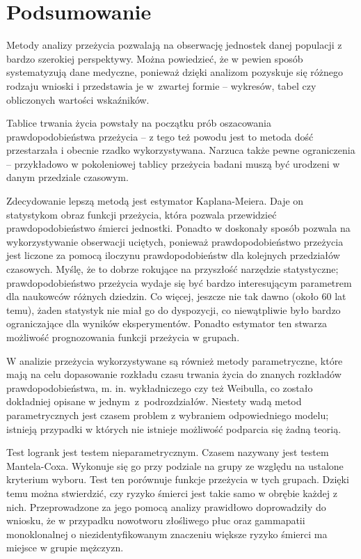 \documentclass[licencjacka]{pwr_wmat_praca_dyplomowa}
\theoremstyle{plain}
\numberwithin{theorem}{chapter}
\theoremstyle{definition}
\numberwithin{theorem}{chapter}
\begin{document}
{\backmatter \chapter{Podsumowanie}}

Metody analizy przeżycia pozwalają na obserwację jednostek danej populacji z bardzo szerokiej perspektywy. Można powiedzieć, że w pewien sposób systematyzują dane medyczne, ponieważ dzięki analizom pozyskuje się różnego rodzaju wnioski i przedstawia je w~zwartej formie -- wykresów, tabel czy obliczonych wartości wskaźników.


Tablice trwania życia powstały na początku prób oszacowania prawdopodobieństwa przeżycia -- z tego też powodu jest to metoda dość przestarzała i obecnie rzadko wykorzystywana. Narzuca także pewne ograniczenia -- przykładowo w pokoleniowej tablicy przeżycia badani muszą być urodzeni w danym przedziale czasowym. 

Zdecydowanie lepszą metodą jest estymator Kaplana-Meiera. Daje on statystykom obraz funkcji przeżycia, która pozwala przewidzieć prawdopodobieństwo śmierci jednostki. Ponadto w doskonały sposób pozwala na  wykorzystywanie obserwacji uciętych, ponieważ prawdopodobieństwo przeżycia jest liczone za pomocą iloczynu prawdopodobieństw dla kolejnych przedziałów czasowych. Myślę, że to dobrze rokujące na przyszłość narzędzie statystyczne; prawdopodobieństwo przeżycia wydaje się być bardzo interesującym parametrem dla naukowców różnych dziedzin. Co więcej, jeszcze nie tak dawno (około 60 lat temu), żaden statystyk nie miał go do dyspozycji, co niewątpliwie było bardzo ograniczające dla wyników eksperymentów. Ponadto estymator ten stwarza możliwość prognozowania funkcji przeżycia w grupach.

W analizie przeżycia wykorzystywane są również metody parametryczne, które mają na celu dopasowanie rozkładu czasu trwania życia do znanych rozkładów prawdopodobieństwa, m. in. wykładniczego czy też Weibulla, co zostało dokładniej opisane w jednym~z~podrozdziałów. Niestety wadą metod parametrycznych jest czasem problem z wybraniem odpowiedniego modelu; istnieją przypadki w których nie istnieje możliwość podparcia się żadną teorią.

Test logrank jest testem nieparametrycznym. Czasem nazywany jest testem Mantela-Coxa. Wykonuje się go przy podziale na grupy ze względu na ustalone kryterium wyboru. Test ten porównuje funkcje przeżycia w tych grupach. Dzięki temu można stwierdzić, czy ryzyko śmierci jest takie samo w obrębie każdej z nich. Przeprowadzone za jego pomocą analizy prawidłowo doprowadziły do wniosku, że w przypadku nowotworu złośliwego płuc oraz gammapatii monoklonalnej o niezidentyfikowanym znaczeniu większe ryzyko śmierci ma miejsce w grupie mężczyzn.
\end{document}

